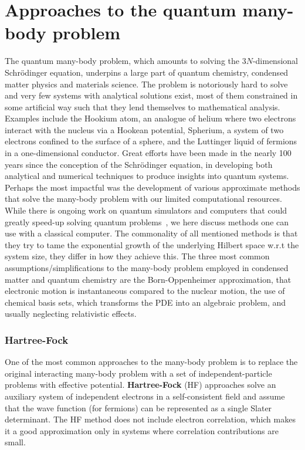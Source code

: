 \section{Approaches to the quantum many-body problem}
\label{sec:QMBP}
The quantum many-body problem, which amounts to solving the $3N$-dimensional Schr\"odinger equation, underpins a large part of quantum chemistry, condensed matter physics and materials science. The problem is notoriously hard to solve and very few systems with analytical solutions exist, most of them constrained in some artificial way such that they lend themselves to mathematical analysis. Examples include the Hookium atom, an analogue of helium where two electrons interact with the nucleus via a Hookean potential, Spherium, a system of two electrons confined to the surface of a sphere, and the Luttinger liquid of fermions in a one-dimensional conductor. Great efforts have been made in the nearly 100 years since the conception of the Schr\" odinger equation, in developing both analytical and numerical techniques to produce insights into quantum systems. Perhaps the most impactful was the development of various approximate methods that solve the many-body problem with our limited computational resources. While there is ongoing work on quantum simulators and computers that could greatly speed-up solving quantum problems~\cite{feynman2018simulating, childs2010relationship}, we here discuss methods one can use with a classical computer. The commonality of all mentioned methods is that they try to tame the exponential growth of the underlying Hilbert space w.r.t the system size, they differ in how they achieve this. The three most common assumptions/simplifications to the many-body problem employed in condensed matter and quantum chemistry are the Born-Oppenheimer approximation, that electronic motion is instantaneous compared to the nuclear motion, the use of chemical basis sets, which transforms the PDE into an algebraic problem, and usually neglecting relativistic effects.

\subsubsection{Hartree-Fock}
One of the most common approaches to the many-body problem is to replace the original interacting many-body problem with a set of independent-particle problems with effective potential. \textbf{Hartree-Fock} (HF) approaches solve an auxiliary system of independent electrons in a self-consistent field and assume that the wave function (for fermions) can be represented as a single Slater determinant. The HF method does not include electron correlation, which makes it a good approximation only in systems where correlation contributions are small. 

